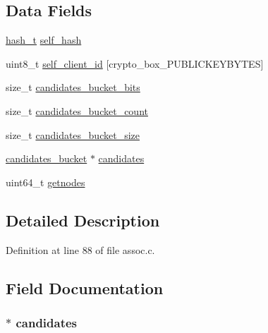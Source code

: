 \subsection*{Data Fields}
\begin{DoxyCompactItemize}
\item 
\hyperlink{assoc_8c_ac2d400520225f5a2aabf44895add81dc}{hash\+\_\+t} \hyperlink{struct_assoc_a6531d0c8e69576ae8c58a02914abaefe}{self\+\_\+hash}
\item 
uint8\+\_\+t \hyperlink{struct_assoc_a59ef97a1dbf10c89fb43f6fff2e65b39}{self\+\_\+client\+\_\+id} \mbox{[}crypto\+\_\+box\+\_\+\+P\+U\+B\+L\+I\+C\+K\+E\+Y\+B\+Y\+T\+E\+S\mbox{]}
\item 
size\+\_\+t \hyperlink{struct_assoc_ab4153986e9b7dd71547967436299a424}{candidates\+\_\+bucket\+\_\+bits}
\item 
size\+\_\+t \hyperlink{struct_assoc_a22dd0674eae131fab27462b931d4397c}{candidates\+\_\+bucket\+\_\+count}
\item 
size\+\_\+t \hyperlink{struct_assoc_a9349f5b3095733f74b3704aa9766a05a}{candidates\+\_\+bucket\+\_\+size}
\item 
\hyperlink{structcandidates__bucket}{candidates\+\_\+bucket} $\ast$ \hyperlink{struct_assoc_a9d492ea4282a0aca2bcb32d987f58175}{candidates}
\item 
uint64\+\_\+t \hyperlink{struct_assoc_aec732782691c39a31d8c579a79a8fed2}{getnodes}
\end{DoxyCompactItemize}


\subsection{Detailed Description}


Definition at line 88 of file assoc.\+c.



\subsection{Field Documentation}
\hypertarget{struct_assoc_a9d492ea4282a0aca2bcb32d987f58175}{
\subsubsection[{candidates}]{$\ast$ candidates}}\label{struct_assoc_a9d492ea4282a0aca2bcb32d987f58175}


